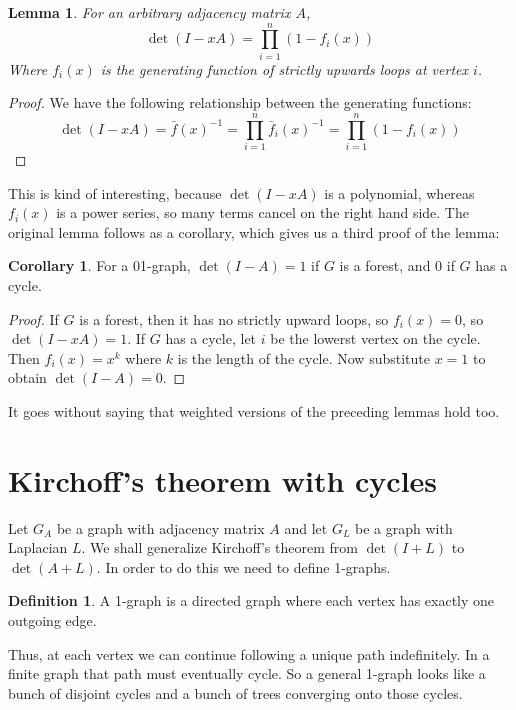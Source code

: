 \documentclass[a4paper, 11pt]{article}
\newtheorem{lemma}[theorem]{Lemma}
\theoremstyle{definition}
\newtheorem{definition}{Definition}[section]
\newtheorem{corollary}{Corollary}[theorem]
\begin{document}
\begin{lemma} For an arbitrary adjacency matrix $A$,
  \[ \det(I - xA) = \prod_{i = 1}^n (1 - f_i(x)) \]
  Where $f_i(x)$ is the generating function of strictly upwards loops at vertex $i$.
\end{lemma}
\begin{proof}
  We have the following relationship between the generating functions:
  \[
    \det(I - xA) = \bar{f}(x)^{-1} = \prod_{i=1}^n \bar{f}_i(x)^{-1} = \prod_{i=1}^n (1 - f_i(x))
  \]
\end{proof}

This is kind of interesting, because $\det(I - xA)$ is a polynomial, whereas $f_i(x)$ is a power series, so many terms cancel on the right hand side. The original lemma follows as a corollary, which gives us a third proof of the lemma:

\begin{corollary}
  For a 01-graph, $\det(I-A)=1$ if $G$ is a forest, and $0$ if $G$ has a cycle.
\end{corollary}
\begin{proof}
  If $G$ is a forest, then it has no strictly upward loops, so $f_i(x) = 0$, so $\det(I - xA) = 1$. If $G$ has a cycle, let $i$ be the lowerst vertex on the cycle. Then $f_i(x) = x^k$ where $k$ is the length of the cycle. Now substitute $x = 1$ to obtain $\det(I - A) = 0$.
\end{proof}

It goes without saying that weighted versions of the preceding lemmas hold too.

\section{Kirchoff's theorem with cycles}

Let $G_A$ be a graph with adjacency matrix $A$ and let $G_L$ be a graph with Laplacian $L$. We shall generalize Kirchoff's theorem from $\det(I + L)$ to $\det(A + L)$. In order to do this we need to define 1-graphs.

\begin{definition}
  A 1-graph is a directed graph where each vertex has exactly one outgoing edge.
\end{definition}

Thus, at each vertex we can continue following a unique path indefinitely. In a finite graph that path must eventually cycle. So a general 1-graph looks like a bunch of disjoint cycles and a bunch of trees converging onto those cycles.
\end{document}
